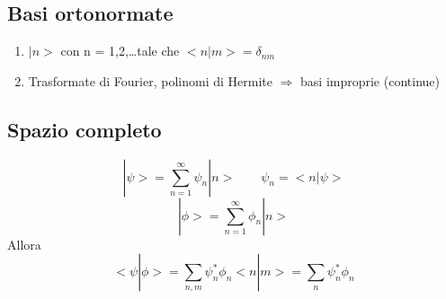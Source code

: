 \subsection*{Basi ortonormate}
\begin{enumerate}
    \item $|n> $ con n = 1,2,\dots tale che $<n|m> = \delta_{nm}$
    \item Trasformate di Fourier, polinomi di Hermite $\Rightarrow$ basi improprie (continue)
\end{enumerate}

\subsection*{Spazio completo}

\begin{equation*}
    |\psi> = \sum_{n=1}^\infty \psi_n |n> \qquad \psi_n = <n | \psi>
\end{equation*}
\begin{equation*}
    |\phi > = \sum_{n=1}^\infty \phi_n |n>
\end{equation*}
Allora 
\begin{equation*}
    <\psi| \phi> = \sum_{n,m} \psi_n^* \phi_n <n|m> = \sum_n \psi^*_n \phi_n
\end{equation*}


